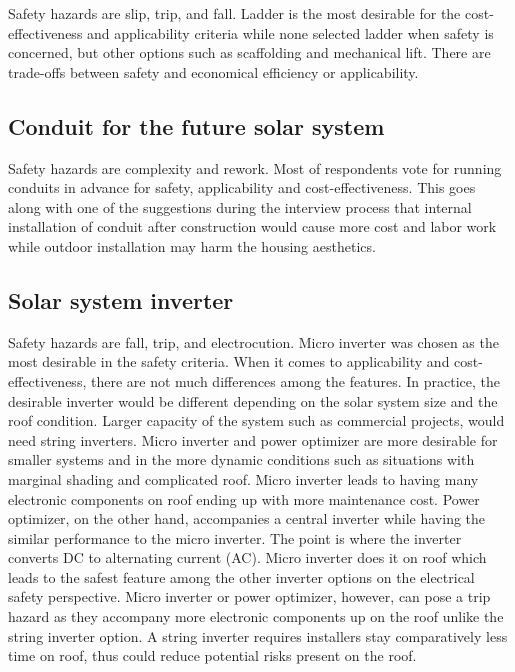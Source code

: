 \documentclass[]{article}
\begin{document}
Safety hazards are slip, trip, and fall. Ladder is the most desirable
for the cost-effectiveness and applicability criteria while none
selected ladder when safety is concerned, but other options such as
scaffolding and mechanical lift. There are trade-offs between safety and
economical efficiency or applicability.

\hypertarget{conduit-for-the-future-solar-system}{%
\subsection{Conduit for the future solar
system}\label{conduit-for-the-future-solar-system}}

Safety hazards are complexity and rework. Most of respondents vote for
running conduits in advance for safety, applicability and
cost-effectiveness. This goes along with one of the suggestions during
the interview process that internal installation of conduit after
construction would cause more cost and labor work while outdoor
installation may harm the housing aesthetics.

\hypertarget{solar-system-inverter}{%
\subsection{Solar system inverter}\label{solar-system-inverter}}

Safety hazards are fall, trip, and electrocution. Micro inverter was
chosen as the most desirable in the safety criteria. When it comes to
applicability and cost-effectiveness, there are not much differences
among the features. In practice, the desirable inverter would be
different depending on the solar system size and the roof condition.
Larger capacity of the system such as commercial projects, would need
string inverters. Micro inverter and power optimizer are more desirable
for smaller systems and in the more dynamic conditions such as
situations with marginal shading and complicated roof. Micro inverter
leads to having many electronic components on roof ending up with more
maintenance cost. Power optimizer, on the other hand, accompanies a
central inverter while having the similar performance to the micro
inverter. The point is where the inverter converts DC to alternating
current (AC). Micro inverter does it on roof which leads to the safest
feature among the other inverter options on the electrical safety
perspective. Micro inverter or power optimizer, however, can pose a trip
hazard as they accompany more electronic components up on the roof
unlike the string inverter option. A string inverter requires installers
stay comparatively less time on roof, thus could reduce potential risks
present on the roof.
\end{document}
